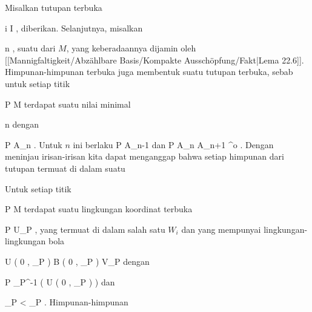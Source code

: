 {

\teilbeweis {}{}{}
{Misalkan tutupan terbuka

 {}
 {i \in I} {}
 {} {} {} {,}
diberikan. Selanjutnya, misalkan

 {}
 {n \in \N} {}
 {} {} {} {,}
suatu
dari $M$, yang keberadaannya dijamin oleh
[[Mannigfaltigkeit/Abzählbare Basis/Kompakte Ausschöpfung/Fakt|Lema 22.6]].
Himpunan-himpunan terbuka
 juga membentuk suatu tutupan terbuka, sebab untuk setiap titik

\mavergleichskette
{\vergleichskette
{ P
}
{ \in }{ M
}
{  }{
}
{    }{
}
{   }{
}
}
{}{}{}
terdapat suatu nilai minimal

\mavergleichskette
{\vergleichskette
{ n
}
{ \in }{ \N
}
{  }{
}
{    }{
}
{   }{
}
}
{}{}{}
dengan

\mavergleichskette
{\vergleichskette
{ P
}
{ \in }{ A_n
}
{  }{
}
{    }{
}
{   }{
}
}
{}{}{}
 {} {.}
Untuk $n$ ini berlaku
\mathkor {} {P \not\in A_{n-1}} {dan} {P \in A_n \subseteq A_{n+1} ^{o}} {.}
Dengan meninjau irisan-irisan
 kita dapat menganggap bahwa setiap himpunan dari tutupan termuat di dalam suatu
}
{}
\teilbeweis {}{}{}
{Untuk setiap titik

\mavergleichskette
{\vergleichskette
{ P
}
{ \in }{ M
}
{  }{
}
{    }{
}
{   }{
}
}
{}{}{}
terdapat suatu lingkungan koordinat terbuka
 {} {}

\mavergleichskette
{\vergleichskette
{ P
}
{ \in }{ U_P
}
{  }{
}
{    }{
}
{   }{
}
}
{}{}{,}
yang termuat di dalam salah satu $W_i$ dan yang mempunyai lingkungan-lingkungan bola

\mavergleichskettedisp
{\vergleichskette
{ U \left(   0 , \delta_P   \right)
}
{ \subset} { B  \left(  0 , \epsilon_P  \right)
}
{ \subset} { V_P
}
{ } {
}
{ } {
}
}
{}{}{}
dengan

\mavergleichskette
{\vergleichskette
{ P
}
{ \in }{ \alpha_P^{-1} \left(  U \left(   0 , \delta_P   \right)  \right)
}
{  }{
}
{    }{
}
{   }{
}
}
{}{}{}
dan

\mavergleichskette
{\vergleichskette
{ \delta_P
}
{ < }{ \epsilon_P
}
{  }{
}
{    }{
}
{   }{
}
}
{}{}{.}
Himpunan-himpunan

}}
